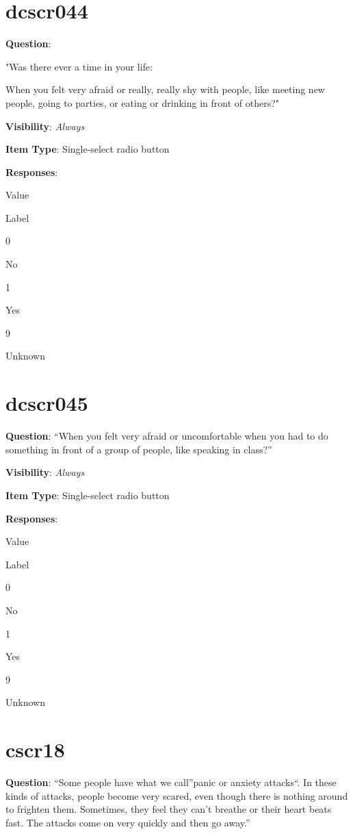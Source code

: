 \documentclass[]{book}
\begin{document}
\hypertarget{dcscr044}{%
\section{dcscr044}\label{dcscr044}}

\textbf{Question}:

"Was there ever a time in your life:

When you felt very afraid or really, really shy with people, like meeting new people, going to parties, or eating or drinking in front of others?"

\textbf{Visibility}: \emph{Always}

\textbf{Item Type}: Single-select radio button

\textbf{Responses}:

Value

Label

0

No

1

Yes

9

Unknown

\hypertarget{dcscr045}{%
\section{dcscr045}\label{dcscr045}}

\textbf{Question}: ``When you felt very afraid or uncomfortable when you had to do something in front of a group of people, like speaking in class?''

\textbf{Visibility}: \emph{Always}

\textbf{Item Type}: Single-select radio button

\textbf{Responses}:

Value

Label

0

No

1

Yes

9

Unknown

\hypertarget{cscr18}{%
\section{cscr18}\label{cscr18}}

\textbf{Question}: ``Some people have what we call''panic or anxiety attacks``. In these kinds of attacks, people become very scared, even though there is nothing around to frighten them. Sometimes, they feel they can't breathe or their heart beats fast. The attacks come on very quickly and then go away.''
\end{document}
